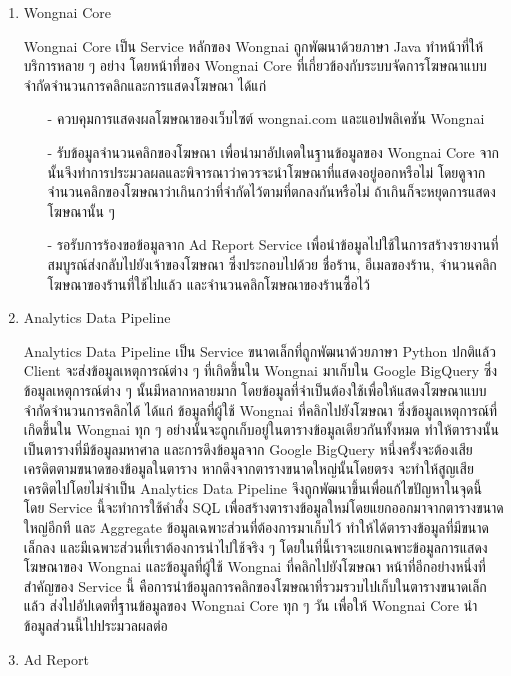 \begin{enumerate}
	\item Wongnai Core
	
	Wongnai Core เป็น Service หลักของ Wongnai ถูกพัฒนาด้วยภาษา Java ทำหน้าที่ให้บริการหลาย ๆ อย่าง โดยหน้าที่ของ Wongnai Core ที่เกี่ยวข้องกับระบบจัดการโฆษณาแบบจำกัดจำนวนการคลิกและการแสดงโฆษณา ได้แก่ 
	\begin{itemize}
		\item[-] ควบคุมการแสดงผลโฆษณาของเว็บไซต์ wongnai.com และแอปพลิเคชัน Wongnai
		\item[-] รับข้อมูลจำนวนคลิกของโฆษณา เพื่อนำมาอัปเดตในฐานข้อมูลของ Wongnai Core จากนั้นจึงทำการประมวลผลและพิจารณาว่าควรจะนำโฆษณาที่แสดงอยู่ออกหรือไม่ โดยดูจากจำนวนคลิกของโฆษณาว่าเกินกว่าที่จำกัดไว้ตามที่ตกลงกันหรือไม่ ถ้าเกินก็จะหยุดการแสดงโฆษณานั้น ๆ
		\item[-] รอรับการร้องขอข้อมูลจาก Ad Report Service เพื่อนำข้อมูลไปใช้ในการสร้างรายงานที่สมบูรณ์ส่งกลับไปยังเจ้าของโฆษณา ซึ่งประกอบไปด้วย ชื่อร้าน, อีเมลของร้าน, จำนวนคลิกโฆษณาของร้านที่ใช้ไปแล้ว และจำนวนคลิกโฆษณาของร้านซื้อไว้
	\end{itemize}
	\item Analytics Data Pipeline
	
	Analytics Data Pipeline เป็น Service ขนาดเล็กที่ถูกพัฒนาด้วยภาษา Python ปกติแล้ว Client จะส่งข้อมูลเหตุการณ์ต่าง ๆ ที่เกิดขึ้นใน Wongnai มาเก็บใน Google BigQuery ซึ่งข้อมูลเหตุการณ์ต่าง ๆ นั้นมีหลากหลายมาก โดยข้อมูลที่จำเป็นต้องใช้เพื่อให้แสดงโฆษณาแบบจำกัดจำนวนการคลิกได้ ได้แก่ ข้อมูลที่ผู้ใช้ Wongnai ที่คลิกไปยังโฆษณา ซึ่งข้อมูลเหตุการณ์ที่เกิดขึ้นใน Wongnai ทุก ๆ อย่างนั้นจะถูกเก็บอยู่ในตารางข้อมูลเดียวกันทั้งหมด ทำให้ตารางนั้นเป็นตารางที่มีข้อมูลมหาศาล และการดึงข้อมูลจาก Google BigQuery หนึ่งครั้งจะต้องเสียเครดิตตามขนาดของข้อมูลในตาราง หากดึงจากตารางขนาดใหญ่นั้นโดยตรง จะทำให้สูญเสียเครดิตไปโดยไม่จำเป็น Analytics Data Pipeline จึงถูกพัฒนาขึ้นเพื่อแก้ไขปัญหาในจุดนี้ โดย Service นี้จะทำการใช้คำสั่ง SQL เพื่อสร้างตารางข้อมูลใหม่โดยแยกออกมาจากตารางขนาดใหญ่อีกที และ Aggregate ข้อมูลเฉพาะส่วนที่ต้องการมาเก็บไว้ ทำให้ได้ตารางข้อมูลที่มีขนาดเล็กลง และมีเฉพาะส่วนที่เราต้องการนำไปใช้จริง ๆ โดยในที่นี้เราจะแยกเฉพาะข้อมูลการแสดงโฆษณาของ Wongnai และข้อมูลที่ผู้ใช้ Wongnai ที่คลิกไปยังโฆษณา หน้าที่อีกอย่างหนึ่งที่สำคัญของ Service นี้ คือการนำข้อมูลการคลิกของโฆษณาที่รวมรวบไปเก็บในตารางขนาดเล็กแล้ว ส่งไปอัปเดตที่ฐานข้อมูลของ Wongnai Core ทุก ๆ วัน เพื่อให้ Wongnai Core นำข้อมูลส่วนนี้ไปประมวลผลต่อ

	\item Ad Report
	

\end{enumerate}
